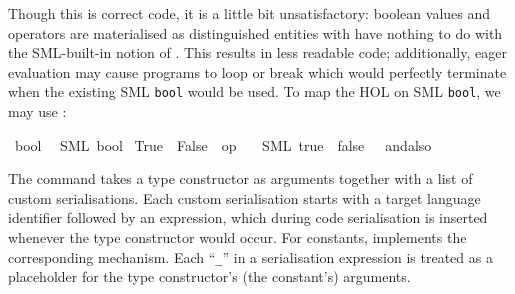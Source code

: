 \begin{isabellebody}
\begin{isamarkuptext}
\begin{typewriter}
  \end{typewriter}%
\end{isamarkuptext}%
\isamarkuptrue%
%
\endisatagquote
{\isafoldquote}%
%
\isadelimquote
%
\endisadelimquote
%
\begin{isamarkuptext}%
\noindent Though this is correct code, it is a little bit
  unsatisfactory: boolean values and operators are materialised as
  distinguished entities with have nothing to do with the SML-built-in
  notion of .  This results in less readable code;
  additionally, eager evaluation may cause programs to loop or break
  which would perfectly terminate when the existing SML \verb|bool| would be used.  To map the HOL  on SML \verb|bool|, we may use :%
\end{isamarkuptext}%
\isamarkuptrue%
%
\isadelimquotett
%
\endisadelimquotett
%
\isatagquotett
{}\isamarkupfalse%
\ bool\isanewline
\ \ {\isacharparenleft}SML\ {\isachardoublequoteopen}bool{\isachardoublequoteclose}{\isacharparenright}\isanewline
{}\isamarkupfalse%
\ True\ \ False\ \ {\isachardoublequoteopen}op\ {\isasymand}{\isachardoublequoteclose}\isanewline
\ \ {\isacharparenleft}SML\ {\isachardoublequoteopen}true{\isachardoublequoteclose}\ \ {\isachardoublequoteopen}false{\isachardoublequoteclose}\ \ {\isachardoublequoteopen}{\isacharunderscore}\ andalso\ {\isacharunderscore}{\isachardoublequoteclose}{\isacharparenright}%
\endisatagquotett
{\isafoldquotett}%
%
\isadelimquotett
%
\endisadelimquotett
%
\begin{isamarkuptext}%
\noindent The \hypertarget{command.code-type}{\hyperlink{command.code-type}{\mbox{}}} command takes a type constructor
  as arguments together with a list of custom serialisations.  Each
  custom serialisation starts with a target language identifier
  followed by an expression, which during code serialisation is
  inserted whenever the type constructor would occur.  For constants,
  \hypertarget{command.code-const}{\hyperlink{command.code-const}{\mbox{}}} implements the corresponding mechanism.  Each
  ``\verb|_|'' in a serialisation expression is treated as a
  placeholder for the type constructor's (the constant's) arguments.%
\end{isamarkuptext}%
\isamarkuptrue%

\end{isabellebody}

